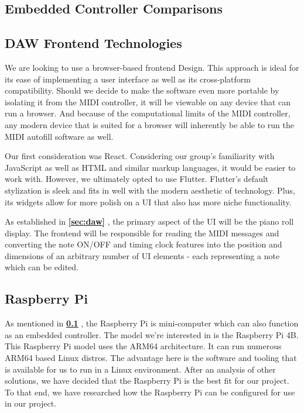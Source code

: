 \blindtext

\subsection{Embedded Controller Comparisons}
\label{sec:embedded_controllers}

\blindtext

\subsection{DAW Frontend Technologies}

We are looking to use a browser-based frontend Design. This approach is ideal for its ease
of implementing a user interface as well as its cross-platform compatibility. Should we
decide to make the software even more portable by isolating it from the MIDI controller,
it will be viewable on any device that can run a browser. And because of the computational
limits of the MIDI controller, any modern device that is suited for a browser will
inherently be able to run the MIDI autofill software as well.

Our first consideration was React. Considering our group's familiarity with JavaScript as
well as HTML and similar markup languages, it would be easier to work with. However, we
ultimately opted to use Flutter. Flutter's default stylization is sleek and fits in well
with the modern aesthetic of technology. Plus, its widgets allow for more polish on a UI
that also has more niche functionality.

As established in \textbf{\ref{sec:daw} }, the primary aspect of the UI
will be the piano roll display. The frontend will be responsible for reading the MIDI
messages and converting the note ON/OFF and timing clock features into the position and
dimensions of an arbitrary number of UI elements - each representing a note which can be
edited.

\subsection{Raspberry Pi}

As mentioned in \textbf{\ref{sec:embedded_controllers}
}, the Raspberry Pi is mini-computer which can also
function as an embedded controller. The model we're interested in is the Raspberry Pi 4B.
This Raspberry Pi model uses the ARM64 architecture. It can run numerous ARM64 based Linux
distros. The advantage here is the software and tooling that is available for us to run in
a Linux environment. After an analysis of other solutions, we have decided that the
Raspberry Pi is the best fit for our project. To that end, we have researched how the
Raspberry Pi can be configured for use in our project.


